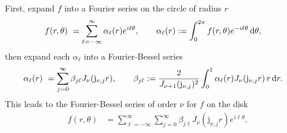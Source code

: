 First, expand $f$ into a Fourier series on the circle of radius $r$
\begin{align}
  f(r, \theta) 
  &\ = \sum_{\ell=-\infty}^\infty \alpha_\ell(r) e^{i\ell\theta}, \qquad
  \alpha_\ell(r) 
  := \int_0^{2\pi} f(r, \theta) e^{-i\ell\theta} \mathop{}\!\mathrm{d}{\theta},
\end{align}
then expand each $\alpha_\ell$ into a Fourier-Bessel series
\begin{align}
  \alpha_\ell(r) 
  &\ = \sum_{j=0}^\infty \beta_{j\ell} J_\nu(\mathrm{j}_{\nu,j}r), \qquad
  \beta_{j\ell} := \frac{2}{J_{\nu+1}(\mathrm{j}_{\nu,j})^2} \int_0^1 \alpha_\ell(r) J_\nu(\mathrm{j}_{\nu,j}r) \, r \mathop{}\!\mathrm{d}{r}.
\end{align}
This leads to the Fourier-Bessel series of order $\nu$ for $f$ on the disk
\begin{align}
  f(r, \theta) 
  &= \sum_{\ell=-\infty}^\infty \sum_{j=0}^\infty \beta_{j\ell} J_\nu(\mathrm{j}_{\nu,j}r) e^{i\ell\theta}.
\end{align}
